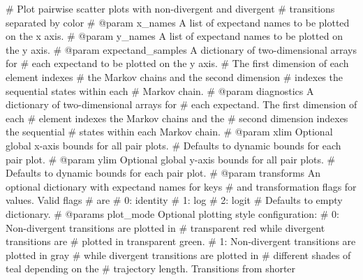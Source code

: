 \documentclass[
  letterpaper,
  DIV=11,
  numbers=noendperiod]{scrartcl}
\newenvironment{Shaded}{\begin{snugshade}}{\end{snugshade}}
\newcommand{\CommentTok}[1]{\textcolor[rgb]{0.37,0.37,0.37}{#1}}
\begin{document}
\begin{Shaded}
\begin{Highlighting}[]
\CommentTok{\# Plot pairwise scatter plots with non{-}divergent and divergent }
\CommentTok{\# transitions separated by color}
\CommentTok{\# @param x\_names A list of expectand names to be plotted on the x axis.}
\CommentTok{\# @param y\_names A list of expectand names to be plotted on the y axis.}
\CommentTok{\# @param expectand\_samples A dictionary of two{-}dimensional arrays for}
\CommentTok{\#                          each expectand to be plotted on the y axis.}
\CommentTok{\#                          The first dimension of each element indexes }
\CommentTok{\#                          the Markov chains and the second dimension }
\CommentTok{\#                          indexes the sequential states within each }
\CommentTok{\#                          Markov chain.}
\CommentTok{\# @param diagnostics A dictionary of two{-}dimensional arrays for}
\CommentTok{\#                    each expectand.  The first dimension of each}
\CommentTok{\#                    element indexes the Markov chains and the }
\CommentTok{\#                    second dimension indexes the sequential }
\CommentTok{\#                    states within each Markov chain.}
\CommentTok{\# @param xlim       Optional global x{-}axis bounds for all pair plots.}
\CommentTok{\#                   Defaults to dynamic bounds for each pair plot.}
\CommentTok{\# @param ylim       Optional global y{-}axis bounds for all pair plots.}
\CommentTok{\#                   Defaults to dynamic bounds for each pair plot.}
\CommentTok{\# @param transforms An optional dictionary with expectand names for keys }
\CommentTok{\#                   and transformation flags for values.  Valid flags }
\CommentTok{\#                   are}
\CommentTok{\#                     0: identity}
\CommentTok{\#                     1: log}
\CommentTok{\#                     2: logit}
\CommentTok{\#                   Defaults to empty dictionary.}
\CommentTok{\# @params plot\_mode Optional plotting style configuration: }
\CommentTok{\#                     0: Non{-}divergent transitions are plotted in }
\CommentTok{\#                        transparent red while divergent transitions are}
\CommentTok{\#                        plotted in transparent green.}
\CommentTok{\#                     1: Non{-}divergent transitions are plotted in gray }
\CommentTok{\#                        while divergent transitions are plotted in }
\CommentTok{\#                        different shades of teal depending on the }
\CommentTok{\#                        trajectory length.  Transitions from shorter}

\end{Highlighting}
\end{Shaded}
\end{document}
